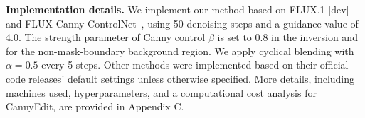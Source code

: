 \documentclass{article}
\begin{document}
\textbf{Implementation details.} We implement our method based on FLUX.1-[dev]~\cite{blackforest2024FLUX} and FLUX-Canny-ControlNet~\cite{xlabsai2025fluxcontrolnet}, using 50 denoising steps and a guidance value of 4.0. The strength parameter of Canny control $\beta$ is set to 0.8 in the inversion and for the non-mask-boundary background region. We apply cyclical blending with $\alpha=0.5$ every 5 steps. Other methods were implemented based on their official code releases' default settings unless otherwise specified. More details, including machines used, hyperparameters, and a computational cost analysis for CannyEdit, are provided in {Appendix C}.

\end{document}
